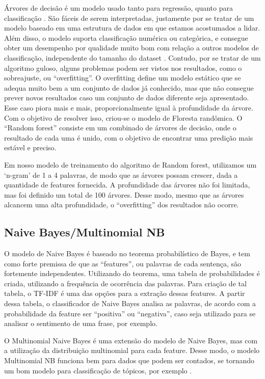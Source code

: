 Árvores de decisão é um modelo usado tanto para regressão, quanto para classificação \cite{decision-tree}. São fáceis de serem interpretadas, justamente por se tratar de um modelo baseado em uma estrutura de dados em que estamos acostumados a lidar. Além disso, o modelo suporta classificação numérica ou categórica, e consegue obter um desempenho por qualidade muito bom com relação a outros modelos de classificação, independente do tamanho do dataset \cite{performance-comparison}. Contudo, por se tratar de um algoritmo guloso, alguns problemas podem ser vistos nos resultados, como o sobreajuste, ou “overfitting”. O overfitting define um modelo estático que se adequa muito bem a um conjunto de dados já conhecido, mas que não consegue prever novos resultados caso um conjunto de dados diferente seja apresentado. Esse caso piora mais e mais, proporcionalmente igual à profundidade da árvore.  Com o objetivo de resolver isso, criou-se o modelo de Floresta randômica. O “Random forest” consiste em um combinado de árvores de decisão, onde o resultado de cada uma é unido, com o objetivo de encontrar uma predição mais estável e preciso.

Em nosso modelo de treinamento do algoritmo de Random forest, utilizamos um ‘n-gram’ de 1 a 4 palavras, de modo que as árvores possam crescer, dada a quantidade de features fornecida. A profundidade das árvores não foi limitada, mas foi definido um total de 100 árvores. Desse modo, mesmo que as árvores alcancem uma alta profundidade, o “overfitting” dos resultados não ocorre.

\subsection{Naive Bayes/Multinomial NB}
O modelo de Naive Bayes é baseado no teorema probabilístico de Bayes, e tem como forte premissa de que as “features”, ou palavras de cada sentença, são fortemente independentes. Utilizando do teorema, uma tabela de probabilidades é criada, utilizando a frequência de ocorrência das palavras. Para criação de tal tabela, o TF-IDF é uma das opções para a extração dessas features. A partir dessa tabela, o classificador de Naive Bayes analisa as palavras, de acordo com a probabilidade da feature ser “positiva” ou “negativa”, caso seja utilizado para se analisar o sentimento de uma frase, por exemplo.

O Multinomial Naive Bayes é uma extensão do modelo de Naive Bayes, mas com a utilização da distribuição multinomial para cada feature. Desse modo, o modelo Multinomial NB funciona bem para dados que podem ser contados, se tornando um bom modelo para classificação de tópicos, por exemplo \cite{russel-ia}.

